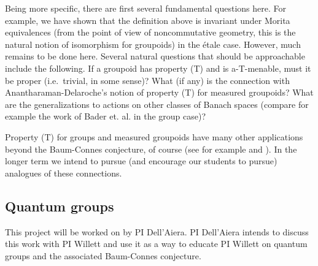 \documentclass[11pt]{article}
\theoremstyle{plain}
\newtheorem{project}[theorem]{Project}
\theoremstyle{definition}
\theoremstyle{remark}
\begin{document}
Being more specific, there are first several fundamental questions here.  For example, we have shown that the definition above is invariant under Morita equivalences (from the point of view of noncommutative geometry, this is the natural notion of isomorphism for groupoids) in the \'{e}tale case.  However, much remains to be done here.  Several natural questions that should be approachable include the following.  If a groupoid has property (T) and is a-T-menable, must it be proper (i.e.\ trivial, in some sense)?  What (if any) is the connection with Anantharaman-Delaroche's notion of property (T) for measured groupoids?  What are the generalizations to actions on other classes of Banach spaces (compare for example the work of Bader et. al. \cite{Bader:2007eg} in the group case)?

Property (T) for groups and measured groupoids have many other applications beyond the Baum-Connes conjecture, of course (see for example \cite[Chapter 6]{Bekka:2000kx} and \cite{Zimmer:2981ds}).  In the longer term we intend to pursue (and encourage our students to pursue) analogues of these connections.  








 
 
 \subsection{Quantum groups}     
 
This project will be worked on by PI Dell'Aiera.  PI Dell'Aiera intends to discuss this work with PI Willett and use it as a way to educate PI Willett on quantum groups and the associated Baum-Connes conjecture.
 
%
%
\end{document}
